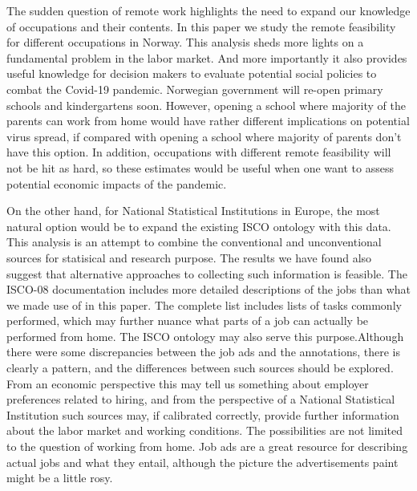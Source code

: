 \documentclass[11pt,]{article}
\begin{document}
The sudden question of remote work highlights the need to expand our
knowledge of occupations and their contents. In this paper we study the
remote feasibility for different occupations in Norway. This analysis
sheds more lights on a fundamental problem in the labor market. And more
importantly it also provides useful knowledge for decision makers to
evaluate potential social policies to combat the Covid-19 pandemic.
Norwegian government will re-open primary schools and kindergartens
soon. However, opening a school where majority of the parents can work
from home would have rather different implications on potential virus
spread, if compared with opening a school where majority of parents
don't have this option. In addition, occupations with different remote
feasibility will not be hit as hard, so these estimates would be useful
when one want to assess potential economic impacts of the pandemic.

On the other hand, for National Statistical Institutions in Europe, the
most natural option would be to expand the existing ISCO ontology with
this data. This analysis is an attempt to combine the conventional and
unconventional sources for statisical and research purpose. The results
we have found also suggest that alternative approaches to collecting
such information is feasible. The ISCO-08 documentation includes more
detailed descriptions of the jobs than what we made use of in this
paper. The complete list includes lists of tasks commonly performed,
which may further nuance what parts of a job can actually be performed
from home. The ISCO ontology may also serve this purpose.Although there
were some discrepancies between the job ads and the annotations, there
is clearly a pattern, and the differences between such sources should be
explored. From an economic perspective this may tell us something about
employer preferences related to hiring, and from the perspective of a
National Statistical Institution such sources may, if calibrated
correctly, provide further information about the labor market and
working conditions. The possibilities are not limited to the question of
working from home. Job ads are a great resource for describing actual
jobs and what they entail, although the picture the advertisements paint
might be a little rosy.

\newpage
\singlespacing 

\end{document}
